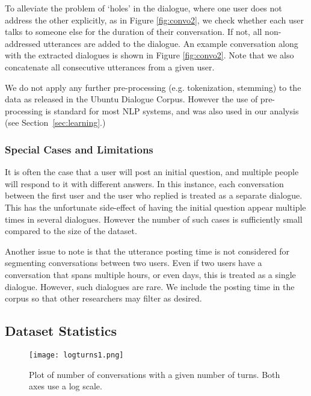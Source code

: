 \documentclass[11pt,a4paper]{article}
\begin{document}
To alleviate the problem of `holes' in the dialogue, where one user does not address the other explicitly, as in Figure \ref{fig:convo2}, we check whether each user talks to someone else for the duration of their conversation. If not, all non-addressed utterances are added to the dialogue.  An example conversation along with the extracted dialogues is shown in Figure \ref{fig:convo2}.  Note that we also concatenate all consecutive utterances from a given user. 

We do not apply any further pre-processing (e.g. tokenization, stemming) to the data as released in the Ubuntu Dialogue Corpus.  However the use of pre-processing is standard for most NLP systems, and was also used in our analysis (see Section~\ref{sec:learning}.)

\subsubsection{Special Cases and Limitations}

It is often the case that a user will post an initial question, and multiple people will respond to it with different answers. In this instance, each conversation between the first user and the user who replied is treated as a separate dialogue. This has the unfortunate side-effect of having the initial question appear multiple times in several dialogues. However the number of such cases is sufficiently small compared to the size of the dataset. 

Another issue to note is that the utterance posting time is not considered for segmenting conversations between two users. Even if two users have a conversation that spans multiple hours, or even days, this is treated as a single dialogue. However, such dialogues are rare.  We include the posting time in the corpus so that other researchers may filter as desired.



\subsection{Dataset Statistics}


\begin{figure}
\centering
\texttt{[image: logturns1.png]}
\caption{\label{fig:turns} Plot of number of conversations with a given number of turns. Both axes use a log scale.}
\end{figure}
\end{document}
